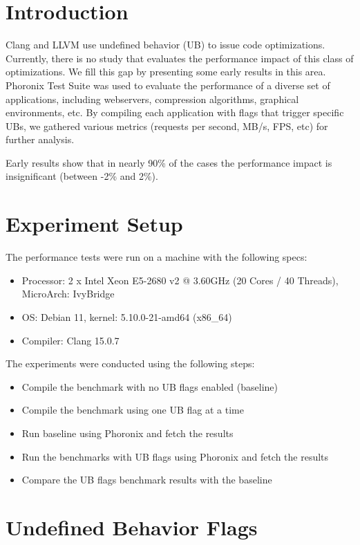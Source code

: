 \documentclass{sciposter}
\begin{document}
\begin{multicols}{3}

\section{Introduction}
Clang and LLVM use undefined behavior (UB) to issue code optimizations.
Currently, there is no study that evaluates the performance impact of this class
of optimizations. We fill this gap by presenting some early results in this
area. Phoronix Test Suite was used to evaluate the performance of a diverse set
of applications, including webservers, compression algorithms, graphical
environments, etc. By compiling each application with flags that trigger
specific UBs, we gathered various metrics (requests per second, MB/s, FPS,
etc) for further analysis.

\begin{large}
Early results show that in nearly 90\% of the cases
the performance impact is insignificant (between -2\% and 2\%).
\end{large}

\section{Experiment Setup}
The performance tests were run on a machine with the following specs:
\begin{itemize}
\item Processor: 2 x Intel Xeon E5-2680 v2 @ 3.60GHz (20 Cores / 40 Threads), MicroArch: IvyBridge
\item OS: Debian 11, kernel: 5.10.0-21-amd64 (x86\_64)
\item Compiler: Clang 15.0.7
\end{itemize}
\bigbreak
\bigbreak
The experiments were conducted using the following steps:
\begin{itemize}
\item Compile the benchmark with no UB flags enabled (baseline)
\item Compile the benchmark using one UB flag at a time
\item Run baseline using Phoronix and fetch the results
\item Run the benchmarks with UB flags using Phoronix and fetch the results
\item Compare the UB flags benchmark results with the baseline
\end{itemize}

\section{Undefined Behavior Flags}


\end{multicols}
\end{document}
